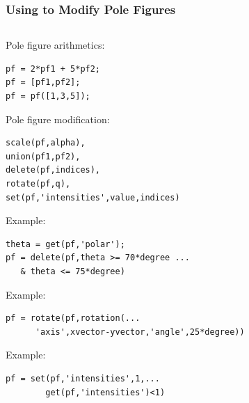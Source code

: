 \begin{frame}[fragile]

  \frametitle{Using \MTEX to Modify Pole Figures}

  \begin{columns}

    \begin{column}{8.5cm}

      Pole figure arithmetics:
\begin{lstlisting}
pf = 2*pf1 + 5*pf2;
pf = [pf1,pf2];
pf = pf([1,3,5]);
\end{lstlisting}

      Pole figure modification:

\begin{lstlisting}
scale(pf,alpha),
union(pf1,pf2),
delete(pf,indices),
rotate(pf,q),
set(pf,'intensities',value,indices)
\end{lstlisting}

      \begin{overprint}

        Example:
\begin{lstlisting}
theta = get(pf,'polar');
pf = delete(pf,theta >= 70*degree ...
   & theta <= 75*degree)
\end{lstlisting}
        Example:
\begin{lstlisting}
pf = rotate(pf,rotation(...
      'axis',xvector-yvector,'angle',25*degree))

\end{lstlisting}
        Example:
\begin{lstlisting}
pf = set(pf,'intensities',1,...
        get(pf,'intensities')<1)
\end{lstlisting}

      \end{overprint}
    \end{column}


\end{columns}
\end{frame}
